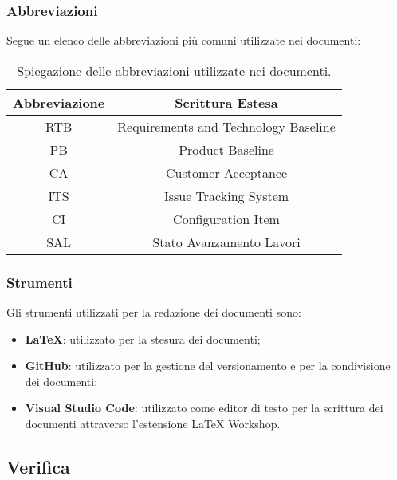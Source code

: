 \subsubsection{Abbreviazioni}
Segue un elenco delle abbreviazioni più comuni utilizzate nei documenti:

\begin{table}[!h]
    \centering
    \begin{tabular}{|c|c|}
    \hline
    \textbf{Abbreviazione} & \textbf{Scrittura Estesa} \\
    \hline
    RTB & Requirements and Technology Baseline \\
    PB & Product Baseline \\
    CA & Customer Acceptance \\
    ITS & Issue Tracking System \\
    CI & Configuration Item \\
    SAL & Stato Avanzamento Lavori \\
    \hline
    \end{tabular}
    \caption{Spiegazione delle abbreviazioni utilizzate nei documenti.}
    \label{tab:1}
\end{table}


\subsubsection{Strumenti}
Gli strumenti utilizzati per la redazione dei documenti sono:
\begin{itemize}
    \item \textbf{\LaTeX{}}: utilizzato per la stesura dei documenti;
    \item \textbf{GitHub}: utilizzato per la gestione del versionamento e per la condivisione dei documenti;
    \item \textbf{Visual Studio Code}: utilizzato come editor di testo per la scrittura dei documenti attraverso l'estensione \LaTeX{} Workshop.
\end{itemize}

\subsection{Verifica}
